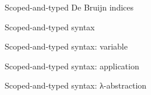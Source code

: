 \documentclass[aspectratio=169]{beamer}
\begin{document}
\begin{frame}{Scoped-and-typed De Bruijn indices}


\end{frame}

\begin{frame}{Scoped-and-typed syntax}
\end{frame}

\begin{frame}{Scoped-and-typed syntax: variable}
  \begin{minipage}[t]{.45\textwidth}
  \end{minipage}\hfill
  \begin{minipage}[t]{.45\textwidth}
  \begin{mathpar}
  \end{mathpar}
  \end{minipage}
\end{frame}

\begin{frame}{Scoped-and-typed syntax: application}
  \begin{minipage}[t]{.45\textwidth}
  \end{minipage}\hfill
  \begin{minipage}[t]{.45\textwidth}
  \begin{mathpar}
  \end{mathpar}
  \end{minipage}
\end{frame}


\begin{frame}{Scoped-and-typed syntax: λ-abstraction}
  \begin{minipage}[t]{.45\textwidth}
  \end{minipage}\hfill
  \begin{minipage}[t]{.45\textwidth}
  \begin{mathpar}
  \end{mathpar}
  \end{minipage}
\end{frame}
\end{document}

